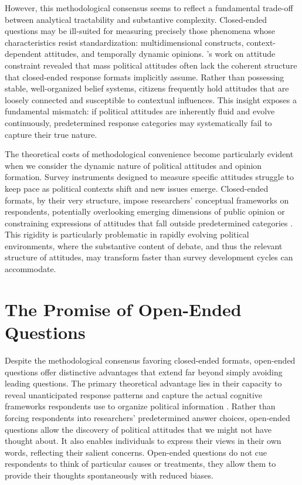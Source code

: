 \documentclass[
  journal=ram,
  manuscript=article-type,
  year=2025,
  volume=unpublished,
]{cup-journal}
\begin{document}
However, this methodological consensus seems to reflect a fundamental trade-off between analytical tractability and substantive complexity.
Closed-ended questions may be ill-suited for measuring precisely those phenomena whose characteristics resist standardization: multidimensional constructs, context-dependent attitudes, and temporally dynamic opinions.
\citet{converse64}'s work on attitude constraint revealed that mass political attitudes often lack the coherent structure that closed-ended response formats implicitly assume.
Rather than possessing stable, well-organized belief systems, citizens frequently hold attitudes that are loosely connected and susceptible to contextual influences.
This insight exposes a fundamental mismatch: if political attitudes are inherently fluid and evolve continuously, predetermined response categories may systematically fail to capture their true nature.

The theoretical costs of methodological convenience become particularly evident when we consider the dynamic nature of political attitudes and opinion formation.
Survey instruments designed to measure specific attitudes struggle to keep pace as political contexts shift and new issues emerge.
Closed-ended formats, by their very structure, impose researchers' conceptual frameworks on respondents, potentially overlooking emerging dimensions of public opinion or constraining expressions of attitudes that fall outside predetermined categories \citep{schuman_presser96}.
This rigidity is particularly problematic in rapidly evolving political environments, where the substantive content of debate, and thus the relevant structure of attitudes, may transform faster than survey development cycles can accommodate.

\section{The Promise of Open-Ended Questions}

Despite the methodological consensus favoring closed-ended formats, open-ended questions offer distinctive advantages that extend far beyond simply avoiding leading questions.
The primary theoretical advantage lies in their capacity to reveal unanticipated response patterns and capture the actual cognitive frameworks respondents use to organize political information \citep{reja_etal03, converse64, foddy93, lazarsfeld44, schuman08}.
Rather than forcing respondents into researchers’ predetermined answer choices, open-ended questions allow the discovery of political attitudes that we might not have thought about.
It also enables individuals to express their views in their own words, reflecting their salient concerns.
Open-ended questions do not cue respondents to think of particular causes or treatments, they allow them to provide their thoughts spontaneously with reduced biases.
\end{document}
